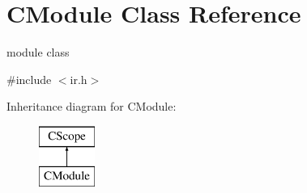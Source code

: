 \hypertarget{classCModule}{\section{C\-Module Class Reference}
\label{classCModule}
}


module class  




{\ttfamily \#include $<$ir.\-h$>$}

Inheritance diagram for C\-Module\-:\begin{figure}[H]
\begin{center}
\leavevmode
\includegraphics[height=2.000000cm]{classCModule}
\end{center}
\end{figure}
